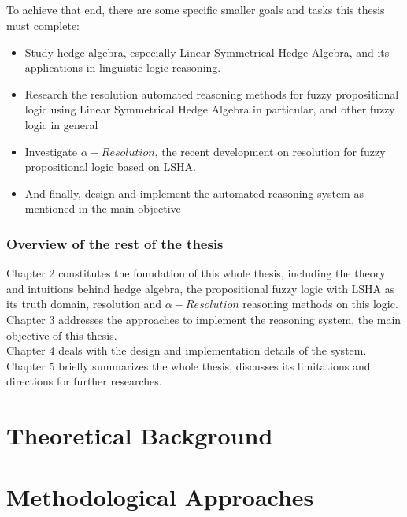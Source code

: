 \documentclass[../gr-final.tex]{subfiles}
\begin{document}
\paragraph{} To achieve that end, there are some specific smaller
goals and tasks this thesis must complete:
\begin{itemize}
        \item Study hedge algebra, especially Linear
        Symmetrical Hedge Algebra, and its applications in
        linguistic logic reasoning. 
        \item Research the resolution automated reasoning methods for
        fuzzy propositional logic using Linear Symmetrical Hedge
        Algebra in particular, and other fuzzy logic in general
        \item Investigate $\alpha-Resolution$, the recent
                development on resolution for fuzzy propositional
                logic based on LSHA.
        \item And finally, design and implement the automated
                reasoning system as mentioned in the main
                objective
\end{itemize}
\subsection{Overview of the rest of the thesis}
Chapter 2 constitutes the foundation of this
whole thesis, including the theory and intuitions behind hedge
algebra, the propositional fuzzy logic with LSHA as its truth
domain, resolution and $\alpha-Resolution$ reasoning methods on
this logic.\\
Chapter 3 addresses the approaches to implement the 
reasoning system, the main objective of this thesis.\\
Chapter 4 deals with the design and implementation details of the
system.\\
Chapter 5 briefly summarizes the whole thesis, discusses its
limitations and directions for further researches.
\chapter{Theoretical Background}




\chapter{Methodological Approaches} 
\end{document}
